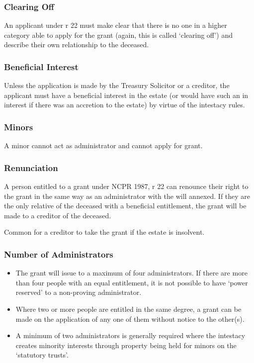 \documentclass[
]{article}
\providecommand{\tightlist}{%
  \setlength{\itemsep}{0pt}\setlength{\parskip}{0pt}}
\begin{document}
\hypertarget{clearing-off}{%
\subsubsection{Clearing Off}\label{clearing-off}}

An applicant under r 22 must make clear that there is no one in a higher
category able to apply for the grant (again, this is called `clearing
off') and describe their own relationship to the deceased.

\hypertarget{beneficial-interest}{%
\subsubsection{Beneficial Interest}\label{beneficial-interest}}

Unless the application is made by the Treasury Solicitor or a creditor,
the applicant must have a beneficial interest in the estate (or would
have such an in interest if there was an accretion to the estate) by
virtue of the intestacy rules.

\hypertarget{minors}{%
\subsubsection{Minors}\label{minors}}

A minor cannot act as administrator and cannot apply for grant.

\hypertarget{renunciation}{%
\subsubsection{Renunciation}\label{renunciation}}

A person entitled to a grant under NCPR 1987, r 22 can renounce their
right to the grant in the same way as an administrator with the will
annexed. If they are the only relative of the deceased with a beneficial
entitlement, the grant will be made to a creditor of the deceased.

Common for a creditor to take the grant if the estate is insolvent.

\hypertarget{number-of-administrators}{%
\subsubsection{Number of
Administrators}\label{number-of-administrators}}

\begin{itemize}
\tightlist
\item
  The grant will issue to a maximum of four administrators. If there are
  more than four people with an equal entitlement, it is not possible to
  have `power reserved' to a non-proving administrator.
\item
  Where two or more people are entitled in the same degree, a grant can
  be made on the application of any one of them without notice to the
  other(s).
\item
  A minimum of two administrators is generally required where the
  intestacy creates minority interests through property being held for
  minors on the `statutory trusts'.
\end{itemize}
\end{document}
